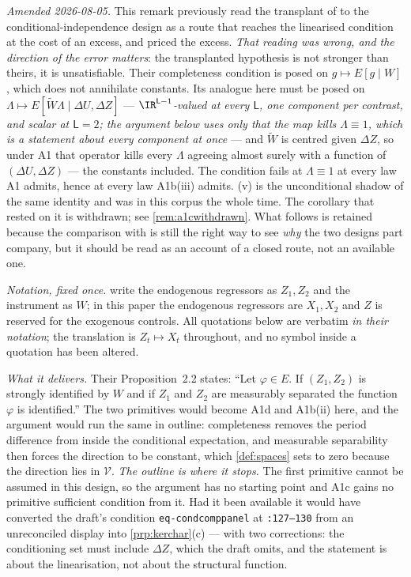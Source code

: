 \begin{remark}\label{rem:ffcompare}
\emph{Amended 2026-08-05.} This remark previously read the transplant of \citet[Prop.~2.2]{feve2014}
to the conditional-independence design as a route that reaches the linearised condition at the cost of
an excess, and priced the excess. \emph{That reading was wrong, and the direction of the error matters}:
the transplanted hypothesis is not stronger than theirs, it is unsatisfiable. Their completeness
condition is posed on $g\mapsto E[g\mid W]$, which does not annihilate constants. Its analogue here
must be posed on $\Lambda\mapsto E[\widetilde W\Lambda\mid\Delta U,\Delta Z]$ ---
\emph{$\IR^{\mathsf L-1}$-valued at every $\mathsf L$, one component per contrast, and scalar at
$\mathsf L=2$; the argument below uses only that the map kills $\Lambda\equiv1$, which is a statement
about every component at once} --- and $\widetilde W$ is
centred given $\Delta Z$, so under A1 that operator kills every $\Lambda$ agreeing almost surely with a
function of $(\Delta U,\Delta Z)$ --- the constants included. The condition fails at $\Lambda\equiv1$
at every law A1 admits, hence at every law A1b(iii) admits. \textup{(v)} is the
unconditional shadow of the same identity and was in this corpus the whole time.
The corollary that rested on it is withdrawn; see \cref{rem:a1cwithdrawn}. What follows is retained
because the comparison with \citet{feve2014} is still the right way to see \emph{why} the two designs
part company, but it should be read as an account of a closed route, not an available one.

\emph{Notation, fixed once.}  write the endogenous regressors as $Z_1,Z_2$ and the
instrument as $W$; in this paper the endogenous regressors are $X_1,X_2$ and $Z$ is reserved for the
exogenous controls. All quotations below are verbatim \emph{in their notation}; the translation is
$Z_t\mapsto X_t$ throughout, and no symbol inside a quotation has been altered.

\emph{What it delivers.} Their Proposition~2.2 states: ``Let $\varphi\in E$. If $(Z_1,Z_2)$ is strongly
identified by $W$ and if $Z_1$ and $Z_2$ are measurably separated the function $\varphi$ is identified.''
The two primitives would become A1d and A1b(ii) here, and the argument would run the same in outline:
completeness removes the period difference
from inside the conditional expectation, and measurable separability then forces the direction to be
constant, which \cref{def:spaces} sets to zero because the direction lies in $\mathcal V$.
\emph{The outline is where it stops.} The first primitive cannot be assumed in this design, so the
argument has no starting point and A1c gains no primitive sufficient condition from it. Had it been
available it would have converted the draft's condition \texttt{eq-condcomppanel} at \texttt{:127--130}
from an unreconciled display into \cref{prp:kerchar}(c) --- with two corrections: the conditioning set
must include $\Delta Z$, which the draft omits, and the statement is about the linearisation, not about
the structural function.


\end{remark}
